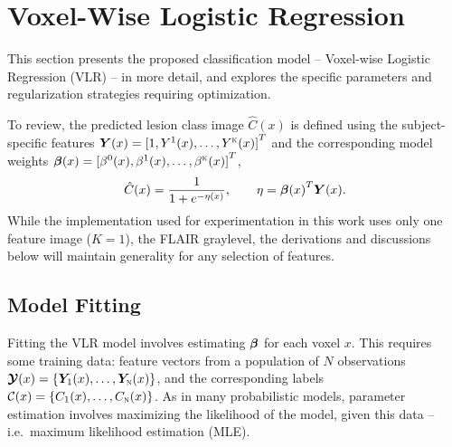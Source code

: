 \chapter{Voxel-Wise Logistic Regression}\label{ch-vlr}
This section presents the proposed classification model
-- Voxel-wise Logistic Regression (VLR) --
in more detail, and explores the specific parameters and regularization strategies
requiring optimization.
\par
To review, the predicted lesion class image $\hat{C}(x)$ is defined
using the subject-specific features $\bm{Y}(x) = {[1,Y^1(x),\dots,Y^{\textsc{k}}(x)]}^T$
and the corresponding model weights $\bm{\beta}(x) = {[\beta^0(x),\beta^1(x),\dots,\beta^{\textsc{k}}(x)]}^T$,
\begin{equation}
  \hat{C}(x) = \frac{1}{1+e^{-\eta(x)}},\qquad\eta = {\bb(x)}^T\bm{Y}(x).%
  \label{eq:eq:vlrmodel}
\end{equation}
While the implementation used for experimentation in this work
uses only one feature image ($K=1$), the FLAIR graylevel,
the derivations and discussions below will maintain generality for any selection of features.
\section{Model Fitting}\label{ss:modelfitting}
Fitting the VLR model involves estimating $\bm{\beta}$ for each voxel $x$.
This requires some training data:
feature vectors from a population of $N$ observations $\bm{\mathcal{Y}}(x) = \{\bm{Y}_1(x),\dots,\bm{Y}_{\textsc{n}}(x)\}$,
and the corresponding labels $\mathcal{C}(x) = \{C_1(x),\dots,C_{\textsc{n}}(x)\}$.
As in many probabilistic models,
parameter estimation involves maximizing the likelihood of the model, given this data --
i.e.\ maximum likelihood estimation (MLE).
